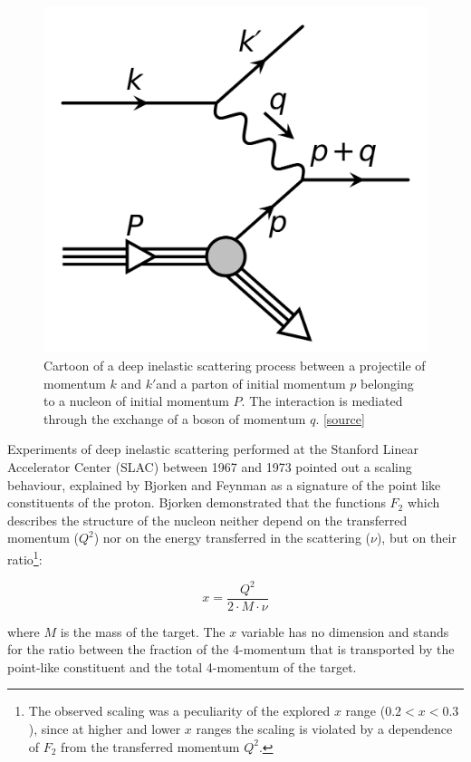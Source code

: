 \begin{figure}[!ht]
\begin{center}
\includegraphics[width=0.5\linewidth]{Chapters/Introduction/Figs/DIS.pdf}
\caption{Cartoon of a deep inelastic scattering process between a projectile of momentum $k$ and $k'$and a parton of initial momentum $p$ belonging to a nucleon of initial momentum $P$. The interaction is mediated through the exchange of a boson of momentum $q$. 
\href{https://commons.wikimedia.org/wiki/File:Deep_inelastic_lepton-hadron_scattering.svg}{[source]}
}
\label{fig:DIS}
\end{center}
\end{figure}

Experiments of deep inelastic scattering performed at the Stanford Linear Accelerator Center (SLAC) between 1967 and 1973 pointed out a scaling behaviour, explained by Bjorken and Feynman as a signature of the point like constituents of the proton.
Bjorken demonstrated that the functions $F_2$ which describes the structure of the nucleon neither depend on the transferred momentum ($Q^2$) nor on the energy transferred in the scattering ($\nu$), but on their ratio\footnote{The observed scaling was a peculiarity of the explored $x$ range ($0.2<x<0.3$), since at higher and lower $x$ ranges the scaling is violated by a dependence of $F_2$ from the transferred momentum $Q^2$.}:

\begin{equation}
    x = \frac{Q^2}{2\cdot M \cdot \nu}
\end{equation}

where $M$ is the mass of the target.
The $x$ variable has no dimension and stands for the ratio between the fraction of the 4-momentum that is transported by the point-like constituent and the total 4-momentum of the target.

